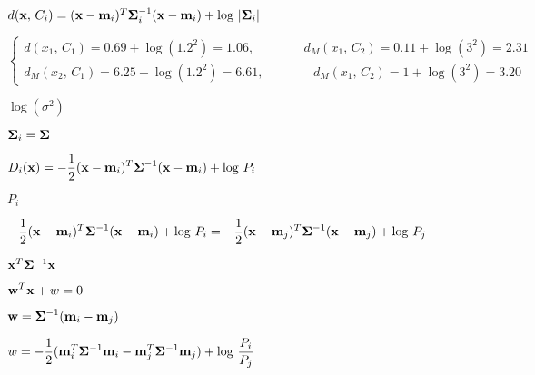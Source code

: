 \documentclass{article}
\def\lthtmlcheckvsize{\ifdim\ht\sizebox<\vsize 
  \ifdim\wd\sizebox<\hsize\expandafter\hfill\fi \expandafter\vfill
  \else\expandafter\vss\fi}%
\begin{document}
{\newpage\clearpage
{}%
$ d({\bf x},\,C_i)=({\bf x}-{\bf m}_i)^T{\bf\Sigma}_i^{-1}({\bf x}-{\bf m}_i)
  +\log\,|{\bf\Sigma}_i |$%
\lthtmlindisplaymathZ
\lthtmlcheckvsize\clearpage}

{\newpage\clearpage
{}%
$\displaystyle \left\{ \begin{array}{l}
d(x_1,\,C_1)=0.69+\log(1.2^2)=1.06,   \;\;\;\;\;\;\;\;\;\;\;\;\;\;
d_M(x_1,\,C_2)=0.11+\log(3^2)=2.31\\
d_M(x_2,\,C_1)=6.25+\log(1.2^2)=6.61,  \;\;\;\;\;\;\;\;\;\;\;\;\;\;
d_M(x_1,\,C_2)=1+\log(3^2)=3.20
\end{array}\right.$%
\lthtmlindisplaymathZ
\lthtmlcheckvsize\clearpage}

{\newpage\clearpage
{}%
$ \log(\sigma^2)$%
\lthtmlindisplaymathZ
\lthtmlcheckvsize\clearpage}

{\newpage\clearpage
{}%
$ {\bf\Sigma}_i={\bf\Sigma}$%
\lthtmlindisplaymathZ
\lthtmlcheckvsize\clearpage}

{\newpage\clearpage
{}%
$\displaystyle D_i({\bf x})=-\frac{1}{2}({\bf x}-{\bf m}_i)^T{\bf\Sigma}^{-1}({\bf x}-{\bf m}_i)
+\log\,P_i$%
\lthtmlindisplaymathZ
\lthtmlcheckvsize\clearpage}

{\newpage\clearpage
{}%
$ P_i$%
\lthtmlindisplaymathZ
\lthtmlcheckvsize\clearpage}

{\newpage\clearpage
{}%
$\displaystyle -\frac{1}{2}({\bf x}-{\bf m}_i)^T{\bf\Sigma}^{-1}({\bf x}-{\bf m}_i)+\log\,P_i
=-\frac{1}{2}({\bf x}-{\bf m}_j)^T{\bf\Sigma}^{-1}({\bf x}-{\bf m}_j)+\log\,P_j$%
\lthtmlindisplaymathZ
\lthtmlcheckvsize\clearpage}

{\newpage\clearpage
{}%
$ {\bf x}^T{\bf\Sigma}^{-1}{\bf x}$%
\lthtmlindisplaymathZ
\lthtmlcheckvsize\clearpage}

{\newpage\clearpage
{}%
$\displaystyle {\bf w}^T{\bf x}+w=0$%
\lthtmlindisplaymathZ
\lthtmlcheckvsize\clearpage}

{\newpage\clearpage
{}%
$\displaystyle {\bf w}={\bf\Sigma}^{-1}({\bf m}_i-{\bf m}_j)$%
\lthtmlindisplaymathZ
\lthtmlcheckvsize\clearpage}

{\newpage\clearpage
{}%
$\displaystyle w=-\frac{1}{2}({\bf m}_i^T{\bf\Sigma}^{-1}{\bf m}_i
-{\bf m}_j^T{\bf\Sigma}^{-1}{\bf m}_j)+\log\,\frac{P_i}{P_j}$%
\lthtmlindisplaymathZ
\lthtmlcheckvsize\clearpage}
\end{document}
